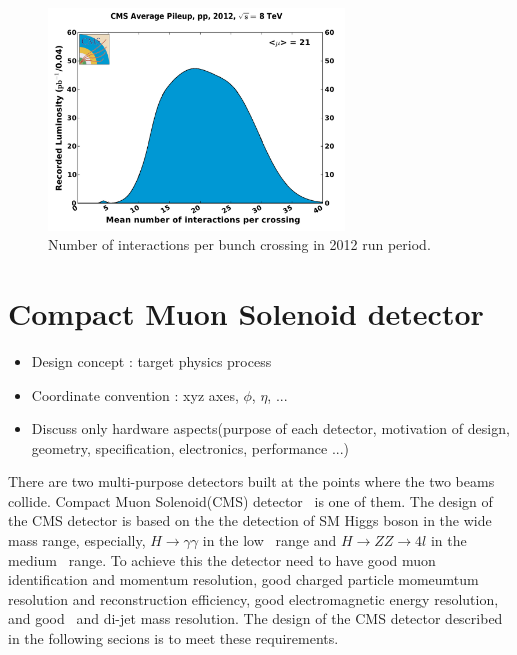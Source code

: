 %
\begin{figure}[ht!] 
\centering 
\includegraphics[width=0.7\textwidth]{figures/pileup_pp_2012.pdf}
\caption{Number of interactions per bunch crossing in 2012 run period.} 
\label{fig:pileup2012} 
\end{figure} 


\section{Compact Muon Solenoid detector} 

\begin{itemize} 
\item Design concept : target physics process 
\item Coordinate convention : xyz axes, $\phi$, $\eta$, ...
\item Discuss only hardware aspects(purpose of each detector, motivation of design, geometry, specification, electronics, performance ...)
\end{itemize} 

There are two multi-purpose detectors built at the points where 
the two beams collide. Compact Muon Solenoid(CMS) detector~\cite{} is one of them. 
The design of the CMS detector is based on the the detection of SM Higgs boson
in the wide mass range, especially, $H \rightarrow \gamma\gamma$ in the low \mHi\ range 
and $H \rightarrow ZZ \rightarrow 4l$ in the medium \mHi\ range. 
To achieve this the detector need to have good muon identification and momentum resolution, 
good charged particle momeumtum resolution and reconstruction efficiency, 
good electromagnetic energy resolution, and good \met\ and di-jet mass resolution. 
The design of the CMS detector described in the following secions 
is to meet these requirements. 

